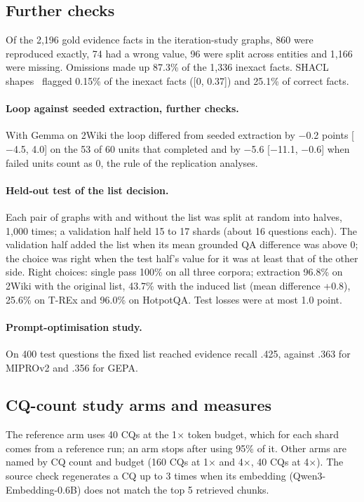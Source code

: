 \subsection{Further checks}
Of the 2,196 gold evidence facts in the iteration-study graphs, 860 were reproduced exactly, 74 had a wrong value, 96 were split across entities and 1,166 were missing. Omissions made up 87.3\% of the 1,336 inexact facts. SHACL shapes~\cite{knublauch2017shacl} flagged 0.15\% of the inexact facts ([0, 0.37]) and 25.1\% of correct facts.

\paragraph{Loop against seeded extraction, further checks.}\label{app:loopfurther} With Gemma on 2Wiki the loop differed from seeded extraction by $-$0.2 points [$-$4.5, 4.0] on the 53 of 60 units that completed and by $-$5.6 [$-$11.1, $-$0.6] when failed units count as 0, the rule of the replication analyses.


\paragraph{Held-out test of the list decision.}\label{app:heldout} Each pair of graphs with and without the list was split at random into halves, 1,000 times; a validation half held 15 to 17 shards (about 16 questions each). The validation half added the list when its mean grounded QA difference was above 0; the choice was right when the test half's value for it was at least that of the other side. Right choices: single pass 100\% on all three corpora; extraction 96.8\% on 2Wiki with the original list, 43.7\% with the induced list (mean difference +0.8), 25.6\% on T-REx and 96.0\% on HotpotQA. Test losses were at most 1.0 point.


\paragraph{Prompt-optimisation study.}\label{app:promptopt} On 400 test questions the fixed list reached evidence recall .425, against .363 for MIPROv2 and .356 for GEPA.

\subsection{CQ-count study arms and measures}
\label{app:exp8def}
The reference arm uses 40 CQs at the 1$\times$ token budget, which for each shard comes from a reference run; an arm stops after using 95\% of it. Other arms are named by CQ count and budget (160 CQs at 1$\times$ and 4$\times$, 40 CQs at 4$\times$). The source check regenerates a CQ up to 3 times when its embedding (Qwen3-Embedding-0.6B) does not match the top 5 retrieved chunks.

